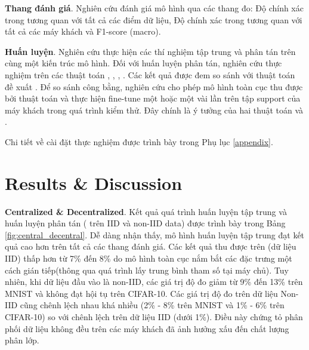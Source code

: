 \documentclass[runningheads]{llncs}
\begin{document}
\textbf{Thang đánh giá}. Nghiên cứu đánh giá mô hình qua các thang đo: Độ chính xác trong tương quan với tất cả các điểm dữ liệu, Độ chính xác trong tương quan với tất cả các máy khách và F1-score (macro).

\textbf{Huấn luyện}. Nghiên cứu thực hiện các thí nghiệm tập trung và phân tán trên cùng một kiến trúc mô hình. Đối với huấn luyện phân tán, nghiên cứu thực nghiệm trên các thuật toán , , , . Các kết quả được đem so sánh với thuật toán đề xuất . Để so sánh công bằng, nghiên cứu cho phép mô hình toàn cục thu được bởi thuật toán  và  thực hiện fine-tune một hoặc một vài lần trên tập support của máy khách trong quá trình kiểm thử. Đây chính là ý tưởng của hai thuật toán  và .

Chi tiết về cài đặt thực nghiệm được trình bày trong Phụ lục \ref{appendix}.

\section{Results \& Discussion}

\textbf{Centralized \& Decentralized}. Kết quả quá trình huấn luyện tập trung và huấn luyện phân tán ( trên IID và non-IID data) được trình bày trong Bảng \ref{fig:central_decentral}. Dễ dàng nhận thấy, mô hình huấn luyện tập trung đạt kết quả cao hơn trên tất cả các thang đánh giá. Các kết quả thu được trên  (dữ liệu IID) thấp hơn từ 7\% đến 8\% do mô hình toàn cục nắm bắt các đặc trưng một cách gián tiếp(thông qua quá trình lấy trung bình tham số tại máy chủ). Tuy nhiên, khi dữ liệu đầu vào là non-IID, các giá trị độ đo giảm từ 9\% đến 13\% trên MNIST và không đạt hội tụ trên CIFAR-10. Các giá trị độ đo trên dữ liệu Non-IID cũng chênh lệch nhau khá nhiều (2\% - 8\% trên MNIST và 1\% - 6\% trên CIFAR-10) so với chênh lệch trên dữ liệu IID (dưới 1\%). Điều này chứng tỏ phân phối dữ liệu không đều trên các máy khách đã ảnh hưởng xấu đến chất lượng phân lớp.
\end{document}

